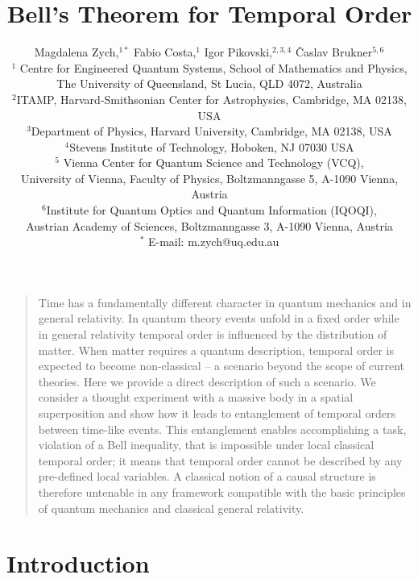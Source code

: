 \documentclass[a4paper,11pt]{article}
\title{Bell's Theorem for Temporal Order}
\author{Magdalena Zych,$^{1\ast}$ Fabio Costa,$^{1}$ Igor Pikovski,$^{2,3,4}$ \v{C}aslav Brukner$^{5,6}$
\\
\normalsize{$^{1}$ Centre for Engineered Quantum Systems, School of Mathematics and Physics,}\\ 
\normalsize{The University of Queensland, St Lucia, QLD 4072, Australia }\\
\normalsize{$^{2}$ITAMP, Harvard-Smithsonian Center for Astrophysics, Cambridge, MA 02138, USA}\\
\normalsize{$^{3}$Department of Physics, Harvard University, Cambridge, MA 02138, USA}\\
\normalsize{$^{4}$Stevens Institute of Technology, Hoboken, NJ 07030 USA}\\
\normalsize{$^{5}$ Vienna Center for Quantum Science and Technology (VCQ),}\\
\normalsize{ University of Vienna, Faculty of Physics, Boltzmanngasse 5, A-1090 Vienna, Austria}\\
 \normalsize{$^{6}$Institute for Quantum Optics and Quantum Information (IQOQI),}\\
\normalsize{ Austrian Academy of Sciences, Boltzmanngasse 3, A-1090 Vienna, Austria}\\
\normalsize{$^\ast$ E-mail: m.zych@uq.edu.au}
}
\date{}
\begin{document}
\maketitle

\begin{quote}
Time has a fundamentally different character in quantum mechanics and in general relativity. In quantum theory events unfold in a fixed order while in general relativity temporal order  is influenced by the distribution of matter. When matter requires a quantum description, temporal order is expected to become non-classical -- a scenario beyond the scope of current theories.  Here we provide a direct description of such a scenario. We consider a thought experiment with a massive body in a spatial superposition and show how it leads to entanglement of temporal orders between time-like events.
 This entanglement enables accomplishing a task, violation of a Bell inequality, that is impossible under local classical temporal order; it means that temporal order cannot be described by any pre-defined local variables. A classical notion of a causal structure is therefore  untenable in any framework compatible with the basic principles of quantum mechanics and classical general relativity.
\end{quote}

\section*{Introduction}
\end{document}
